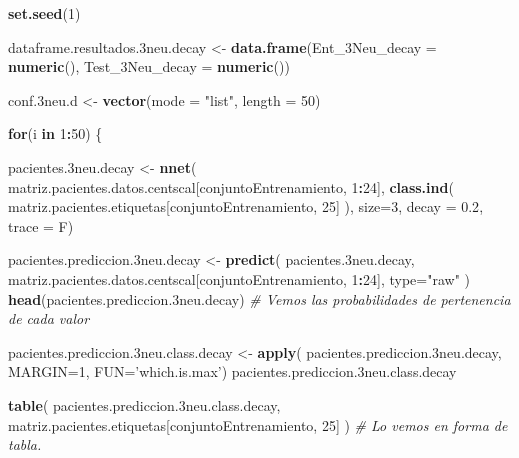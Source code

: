 \documentclass[]{article}
\newenvironment{Shaded}{\begin{snugshade}}{\end{snugshade}}
\newcommand{\CommentTok}[1]{\textcolor[rgb]{0.56,0.35,0.01}{\textit{#1}}}
\newcommand{\ControlFlowTok}[1]{\textcolor[rgb]{0.13,0.29,0.53}{\textbf{#1}}}
\newcommand{\DataTypeTok}[1]{\textcolor[rgb]{0.13,0.29,0.53}{#1}}
\newcommand{\DecValTok}[1]{\textcolor[rgb]{0.00,0.00,0.81}{#1}}
\newcommand{\FloatTok}[1]{\textcolor[rgb]{0.00,0.00,0.81}{#1}}
\newcommand{\KeywordTok}[1]{\textcolor[rgb]{0.13,0.29,0.53}{\textbf{#1}}}
\newcommand{\NormalTok}[1]{#1}
\newcommand{\OperatorTok}[1]{\textcolor[rgb]{0.81,0.36,0.00}{\textbf{#1}}}
\newcommand{\StringTok}[1]{\textcolor[rgb]{0.31,0.60,0.02}{#1}}
\begin{document}
\begin{Shaded}
\begin{Highlighting}[]
\KeywordTok{set.seed}\NormalTok{(}\DecValTok{1}\NormalTok{)}

\NormalTok{dataframe.resultados}\FloatTok{.3}\NormalTok{neu.decay <-}\StringTok{ }\KeywordTok{data.frame}\NormalTok{(}\DataTypeTok{Ent_3Neu_decay =} \KeywordTok{numeric}\NormalTok{(),}
                                              \DataTypeTok{Test_3Neu_decay =} \KeywordTok{numeric}\NormalTok{())}

\NormalTok{conf}\FloatTok{.3}\NormalTok{neu.d <-}\StringTok{ }\KeywordTok{vector}\NormalTok{(}\DataTypeTok{mode =} \StringTok{"list"}\NormalTok{, }\DataTypeTok{length =} \DecValTok{50}\NormalTok{)}

\ControlFlowTok{for}\NormalTok{(i }\ControlFlowTok{in} \DecValTok{1}\OperatorTok{:}\DecValTok{50}\NormalTok{)}
\NormalTok{\{}

\NormalTok{  pacientes}\FloatTok{.3}\NormalTok{neu.decay <-}\StringTok{ }\KeywordTok{nnet}\NormalTok{( matriz.pacientes.datos.centscal[conjuntoEntrenamiento, }\DecValTok{1}\OperatorTok{:}\DecValTok{24}\NormalTok{],}
                                \KeywordTok{class.ind}\NormalTok{( matriz.pacientes.etiquetas[conjuntoEntrenamiento, }\DecValTok{25}\NormalTok{] ),}
                                \DataTypeTok{size=}\DecValTok{3}\NormalTok{,}
                                \DataTypeTok{decay =} \FloatTok{0.2}\NormalTok{, }
                                \DataTypeTok{trace =}\NormalTok{ F)}
  
\NormalTok{  pacientes.prediccion}\FloatTok{.3}\NormalTok{neu.decay <-}\StringTok{ }\KeywordTok{predict}\NormalTok{( pacientes}\FloatTok{.3}\NormalTok{neu.decay, matriz.pacientes.datos.centscal[conjuntoEntrenamiento, }\DecValTok{1}\OperatorTok{:}\DecValTok{24}\NormalTok{], }\DataTypeTok{type=}\StringTok{"raw"}\NormalTok{ )}
  \KeywordTok{head}\NormalTok{(pacientes.prediccion}\FloatTok{.3}\NormalTok{neu.decay) }\CommentTok{# Vemos las probabilidades de pertenencia de cada valor}
  
  
\NormalTok{  pacientes.prediccion}\FloatTok{.3}\NormalTok{neu.class.decay <-}\StringTok{ }\KeywordTok{apply}\NormalTok{( pacientes.prediccion}\FloatTok{.3}\NormalTok{neu.decay, }\DataTypeTok{MARGIN=}\DecValTok{1}\NormalTok{, }\DataTypeTok{FUN=}\StringTok{'which.is.max'}\NormalTok{)}
\NormalTok{  pacientes.prediccion}\FloatTok{.3}\NormalTok{neu.class.decay}
  
  
  \KeywordTok{table}\NormalTok{( pacientes.prediccion}\FloatTok{.3}\NormalTok{neu.class.decay, matriz.pacientes.etiquetas[conjuntoEntrenamiento, }\DecValTok{25}\NormalTok{] )  }\CommentTok{# Lo vemos en forma de tabla.}
  

\end{Highlighting}
\end{Shaded}
\end{document}
